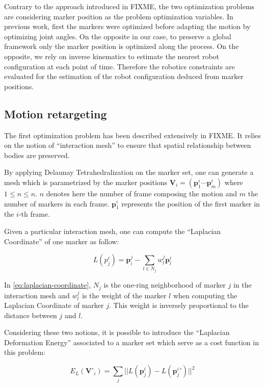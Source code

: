\documentclass[letterpaper, 10 pt, conference]{ieeeconf}  %
\begin{document}
Contrary to the approach introduced in FIXME, the two optimization
problems are considering marker position as the problem optimization
variables. In previous work, first the markers were optimized before
adapting the motion by optimizing joint angles. On the opposite in our
case, to preserve a global framework only the marker position is
optimized along the process. On the opposite, we rely on inverse
kinematics to estimate the nearest robot configuration at each point
of time. Therefore the robotics constraints are evaluated for the
estimation of the robot configuration deduced from marker positions.


\subsection{Motion retargeting}


The first optimization problem has been described extensively in
FIXME. It relies on the notion of ``interaction mesh'' to ensure that
spatial relationship between bodies are preserved.

By applying Delaunay Tetrahedralization \cite{FIXME} on the marker
set, one can generate a mesh which is parametrized by the marker
positions $\mathbf{V}_i = (\mathbf{p}^i_1 \cdots \mathbf{p}^i_m)$
where $1 \leq n \leq n$. $n$ denotes here the number of frame
composing the motion and $m$ the number of markers in each
frame. $\mathbf{p}^i_1$ represents the position of the first marker in
the $i$-th frame.

Given a particular interaction mesh, one can compute the ``Laplacian
Coordinate'' of one marker as follow:

\begin{equation}\label{eq:laplacian-coordinate}
L(p^i_j) = \mathbf{p}_i^j - \sum_{l \in N_j} w^j_l \mathbf{p}^i_l
\end{equation}

In \autoref{eq:laplacian-coordinate}, $N_j$ is the one-ring
neighborhood of marker $j$ in the interaction mesh and $w^j_l$ is the
weight of the marker $l$ when computing the Laplacian Coordinate of
marker $j$. This weight is inversely proportional to the distance
between $j$ and $l$.

Considering these two notions, it is possible to introduce the
``Laplacian Deformation Energy'' associated to a marker set which
serve as a cost function in this problem:

\begin{equation}
E_L(\mathbf{V'}_i) = \sum_j || L(\mathbf{p}^i_j) - L(\mathbf{p}^i_j{}') ||^2
\end{equation}
\end{document}
